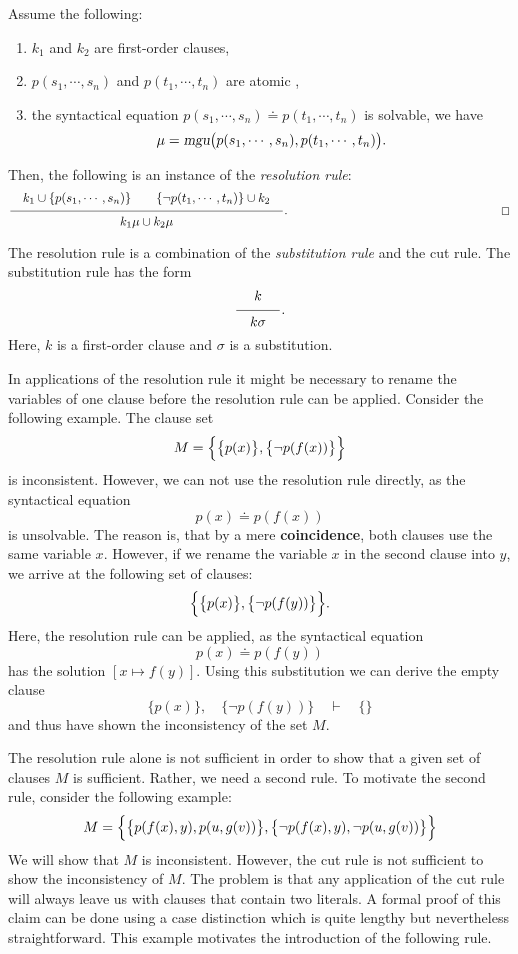 \begin{Definition}[Resolution] 
Assume the following:
\begin{enumerate}
\item $k_1$ and $k_2$ are first-order clauses,
\item $p(s_1,\cdots,s_n)$ and $p(t_1,\cdots,t_n)$ are atomic \formulae,
\item the syntactical equation  $p(s_1,\cdots,s_n)  \doteq p(t_1,\cdots,t_n)$ is solvable, we have
      \[ \mu = \textsl{mgu}\bigl(p(s_1,\cdots,s_n), p(t_1,\cdots,t_n)\bigr). \]
\end{enumerate}
Then, the following is an instance of the \emph{resolution rule}:
 \[ \schluss{k_1 \cup\{ p(s_1,\cdots,s_n)\} \quad\quad \{\neg p(t_1,\cdots,t_n)\} \cup k_2}{
             k_1\mu \cup k_2\mu}.
 \hspace*{6cm} \Box
 \]
\end{Definition}
The resolution rule is a combination of the  \emph{substitution rule} and the cut rule.  The substitution
rule has the form
\[ \schluss{k}{k\sigma}. \]
Here, $k$ is a first-order clause and $\sigma$ is a substitution.

In applications of the resolution rule it might be necessary to rename the variables of one clause 
before the resolution rule can be applied.  Consider the following example.
The clause set  
\[ M = \Bigl\{ \bigl\{ p(x) \bigr\}, \bigl\{ \neg p(f(x)) \bigr\} \Bigr\} \]
is inconsistent.  However, we can not use the resolution rule directly, as the syntactical equation 
\[ p(x) \doteq p(f(x)) \]
is unsolvable.  The reason is, that by a mere  \textbf{coincidence}, both clauses use the same variable $x$.
However, if we rename the variable $x$ in the second clause into $y$, we arrive at the following set of clauses:
\[ \Bigl\{ \bigl\{ p(x) \bigr\}, \bigl\{ \neg p(f(y)) \bigr\} \Bigr\}. \]
Here, the resolution rule can be applied, as the syntactical equation 
\[ p(x) \doteq p(f(y)) \]
has the solution $[x \mapsto f(y)]$.  Using this substitution we can derive the empty clause 
\[ \bigl\{ p(x) \bigr\}, \quad \bigl\{ \neg p(f(y)) \bigr\} \quad \vdash \quad \{\} \]
and thus have shown the inconsistency of the set  $M$.

\noindent
The resolution rule alone is not sufficient in order to show that a given set of clauses $M$ is sufficient.
Rather, we need a second rule.  To motivate the second rule, consider the following example:
\[ M = \Bigl\{ \bigl\{p(f(x),y), p(u,g(v))\bigr\}, 
               \bigl\{\neg p(f(x),y), \neg p(u,g(v))\bigr\} \Bigr\} 
\]
We will show that  $M$ is inconsistent.  However, the cut rule is not sufficient to show the
inconsistency of $M$.  The problem is that any application of the cut rule will always leave us with
clauses that contain two literals.  A formal proof of this claim can be done using a case distinction
which is quite lengthy but nevertheless straightforward.  This example motivates the introduction of the
following rule.

